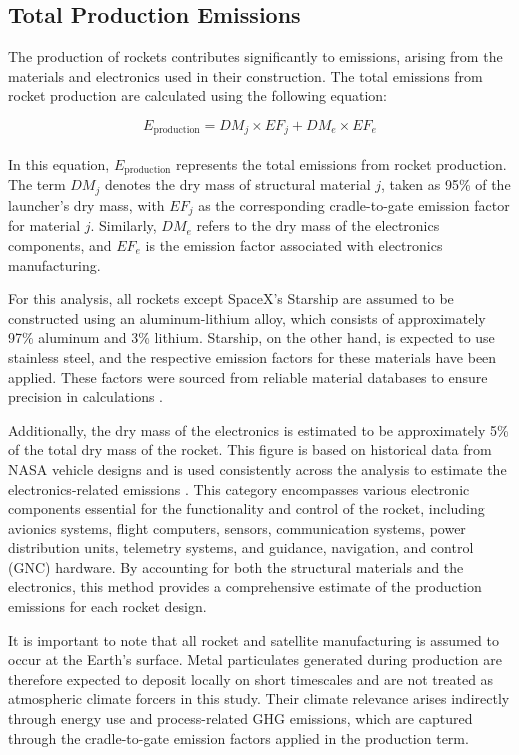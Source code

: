 \documentclass[pdflatex,sn-mathphys-num]{sn-jnl}
\theoremstyle{thmstyleone}%
\theoremstyle{thmstyletwo}%
\theoremstyle{thmstylethree}%
\begin{document}
\subsection{Total Production Emissions}

The production of rockets contributes significantly to emissions, arising from the materials and electronics used in their construction. The total emissions from rocket production are calculated using the following equation:

\begin{equation}
E_{\text{production}} = DM_{j} \times EF_{j} + DM_{e} \times EF_{e}
\end{equation}
\\
In this equation, \( E_{\text{production}} \) represents the total emissions from rocket production. The term \( DM_{j} \) denotes the dry mass of structural material \( j \), taken as 95\% of the launcher's dry mass, with \( EF_{j} \) as the corresponding cradle-to-gate emission factor for material \( j \). Similarly, \( DM_{e} \) refers to the dry mass of the electronics components, and \( EF_{e} \) is the emission factor associated with electronics manufacturing.

For this analysis, all rockets except SpaceX's Starship are assumed to be constructed using an aluminum-lithium alloy, which consists of approximately 97\% aluminum and 3\% lithium. Starship, on the other hand, is expected to use stainless steel, and the respective emission factors for these materials have been applied. These factors were sourced from reliable material databases to ensure precision in calculations \citep{iai_notitle_nodate}.

Additionally, the dry mass of the electronics is estimated to be approximately 5\% of the total dry mass of the rocket. This figure is based on historical data from NASA vehicle designs and is used consistently across the analysis to estimate the electronics-related emissions \citep{motiwala_conceptual_2014}. This category encompasses various electronic components essential for the functionality and control of the rocket, including avionics systems, flight computers, sensors, communication systems, power distribution units, telemetry systems, and guidance, navigation, and control (GNC) hardware. By accounting for both the structural materials and the electronics, this method provides a comprehensive estimate of the production emissions for each rocket design.

It is important to note that all rocket and satellite manufacturing is assumed to occur at the Earth’s surface. Metal particulates generated during production are therefore expected to deposit locally on short timescales and are not treated as atmospheric climate forcers in this study. Their climate relevance arises indirectly through energy use and process-related GHG emissions, which are captured through the cradle-to-gate emission factors applied in the production term.
\end{document}
